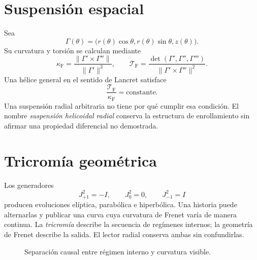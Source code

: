 \section{Suspensión espacial}

Sea
\[
 \Gamma(\theta)=
 \bigl(r(\theta)\cos\theta,r(\theta)\sin\theta,z(\theta)\bigr).
\]
Su curvatura y torsión se calculan mediante
\[
 \kappa_{\mathrm{F}}=\frac{\|\Gamma'\times\Gamma''\|}{\|\Gamma'\|^3},
 \qquad
 \mathcal T_{\mathrm{F}}=
 \frac{\det(\Gamma',\Gamma'',\Gamma''')}
 {\|\Gamma'\times\Gamma''\|^2}.
\]
Una hélice general en el sentido de Lancret satisface
\[
 \frac{\mathcal T_{\mathrm{F}}}{\kappa_{\mathrm{F}}}=\text{constante}.
\]
Una suspensión radial arbitraria no tiene por qué cumplir esa condición. El
nombre \emph{suspensión helicoidal radial} conserva la estructura de
enrollamiento sin afirmar una propiedad diferencial no demostrada.

\section{Tricromía geométrica}

Los generadores
\[
 J_{+1}^2=-I,\qquad J_0^2=0,\qquad J_{-1}^2=I
\]
producen evoluciones elíptica, parabólica e hiperbólica. Una historia puede
alternarlas y publicar una curva cuya curvatura de Frenet varía de manera
continua. La \emph{tricromía} describe la secuencia de regímenes internos;
la geometría de Frenet describe la salida. El lector radial conserva ambas
sin confundirlas.

\begin{figure}[htbp]
\centering
{}
\caption{Separación causal entre régimen interno y curvatura visible.}
\label{espiral:fig:trit-frenet}
\end{figure}

